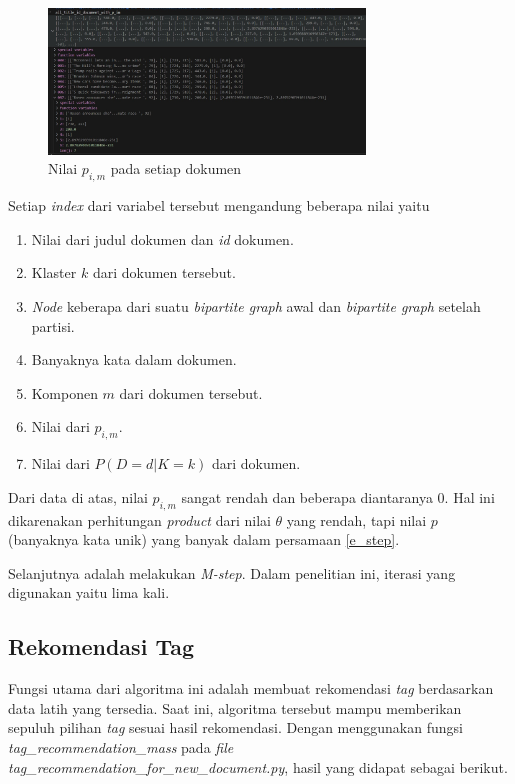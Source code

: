 \begin{figure}[H]
  \centering
  \includegraphics[width=0.75\textwidth]{gambar/bab_4_image/pim in document.jpg}
  \caption{Nilai $p_{i,m}$ pada setiap dokumen }
  \label{gambar:pim}
\end{figure}

Setiap \textit{index} dari variabel tersebut mengandung beberapa nilai yaitu
\begin{enumerate}
  \item Nilai dari judul dokumen dan \textit{id} dokumen.
  \item Klaster $k$ dari dokumen tersebut.
  \item \textit{Node} keberapa dari suatu \textit{bipartite graph} awal dan \textit{bipartite graph} setelah partisi.
  \item Banyaknya kata dalam dokumen.
  \item Komponen $m$ dari dokumen tersebut.
  \item Nilai dari $p_{i,m}$.
  \item Nilai dari $P(D=d|K=k)$ dari dokumen.
\end{enumerate}

Dari data di atas, nilai $p_{i,m}$ sangat rendah dan beberapa diantaranya 0. Hal ini dikarenakan perhitungan \textit{product}
dari nilai $\theta$ yang rendah, tapi nilai $p$ (banyaknya kata unik) yang banyak dalam persamaan \ref*{e_step}.

Selanjutnya adalah melakukan \textit{M-step}. Dalam penelitian ini, iterasi yang digunakan yaitu lima kali.

\subsection{Rekomendasi Tag}

Fungsi utama dari algoritma ini adalah membuat rekomendasi \textit{tag} berdasarkan
data latih yang tersedia. Saat ini, algoritma tersebut mampu memberikan sepuluh
pilihan \textit{tag} sesuai hasil rekomendasi. Dengan menggunakan fungsi
\textit{tag\_recommendation\_mass} pada \textit{file} \textit{tag\_recommendation\_for\_new\_document.py},
hasil yang didapat sebagai berikut.

